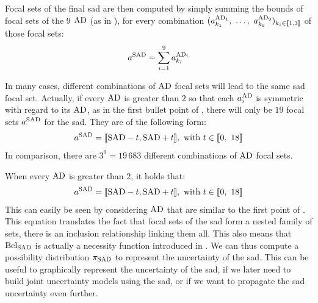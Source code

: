 Focal sets of the final \acrshort{sad} are then computed by simply summing the bounds of focal sets of the 9 $\mathrm{AD}$ (as in ), for every combination $(a^{\mathrm{AD}_1}_{k_1}, ~\ldots, ~ a^{\mathrm{AD}_9}_{k_9})_{k_i\in[\![1,3]\!]}$ of those focal sets:
\begin{align}
    a^{\mathrm{SAD}}=\sum_{i=1}^9a^{\mathrm{AD}_i}_{k_i}
\end{align}

In many cases, different combinations of $\mathrm{AD}$ focal sets will lead to the same \acrshort{sad} focal set. Actually, if every $\mathrm{AD}$ is greater than $2$ so that each $a^{\mathrm{AD}}_i$ is symmetric with regard to its $\mathrm{AD}$, as in the first bullet point of , there will only be $19$ focal sets $a^{\mathrm{SAD}}$ for the \acrshort{sad}. They are of the following form:
\begin{align}\label{eq:nested_SAD}
    a^{\mathrm{SAD}} = [\![\mathrm{SAD}-t,\mathrm{SAD}+t]\!],\text{ with }t\in[\![0, ~18]\!]
\end{align}
In comparison, there are $3^9=19\,683$ different combinations of $\mathrm{AD}$ focal sets.

When every $\mathrm{AD}$ is greater than $2$, it holds that:
\begin{align*}
    a^{\mathrm{SAD}} = [\![\mathrm{SAD}-t,\mathrm{SAD}+t]\!],\text{ with }t\in[\![0, ~18]\!]
\end{align*}
This can easily be seen by considering $\mathrm{AD}$ that are similar to the first point of . This equation translates the fact that focal sets of the \acrshort{sad} form a nested family of sets, \ie there is an inclusion relationship linking them all. This also means that $\mathrm{Bel}_{\mathrm{SAD}}$ is actually a necessity function introduced in . We can thus compute a possibility distribution $\pi_{\mathrm{SAD}}$ to represent the uncertainty of the \acrshort{sad}. This can be useful to graphically represent the uncertainty of the \acrshort{sad}, if we later need to build joint uncertainty models using the \acrshort{sad}, or if we want to propagate the \acrshort{sad} uncertainty even further.

